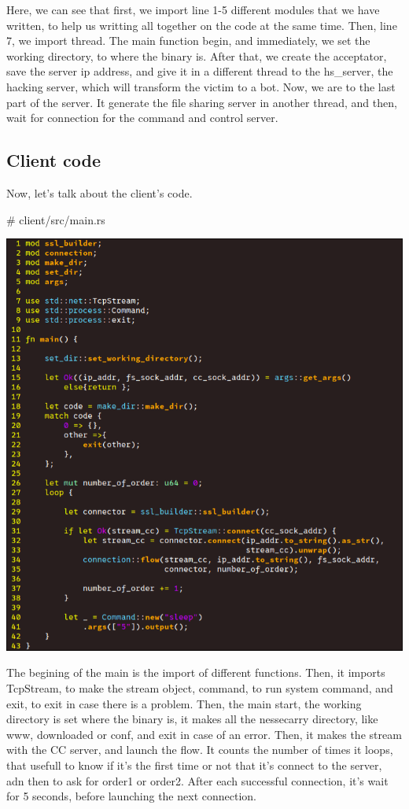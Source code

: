 \documentclass[../main.tex]{subfiles}
\begin{document}
    Here, we can see that first, we import line 1-5 different modules that we have written, to help us writting all together on the code at the same time.
    Then, line 7, we import thread.
    The main function begin, and immediately, we set the working directory, to where the binary is.
    After that, we create the acceptator, save the server ip address, and give it in a different thread to the hs\_server, the hacking server, which will transform the victim to a bot.
    Now, we are to the last part of the server.
    It generate the file sharing server in another thread, and then, wait for connection for the command and control server.

    
	\vspace{10pt}

	\subsection{Client code}

    Now, let's talk about the client's code.

    \# client/src/main.rs

    \includegraphics[width=450pt]{client_main.png}

    The begining of the main is the import of different functions.
    Then, it imports TcpStream, to make the stream object, command, to run system command, and exit, to exit in case there is a problem.
    Then, the main start, the working directory is set where the binary is, it makes all the nessecarry directory, like www, downloaded or conf, and exit in case of an error.
    Then, it makes the stream with the CC server, and launch the flow. 
    It counts the number of times it loops, that usefull to know if it's the first time or not that it's connect to the server, adn then to ask for order1 or order2.
    After each successful connection, it's wait for 5 seconds, before launching the next connection.
\end{document}
